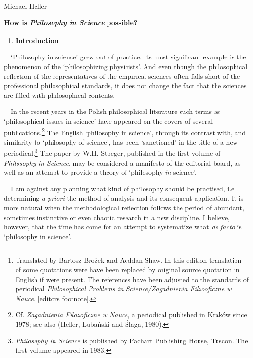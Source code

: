 \documentclass[a4paper]{article}
\title{}
\begin{document}
{\centering
Michael Heller
\par}

{\centering
\textbf{How is }\textbf{\textit{Philosophy in Science }}\textbf{possible?}
\par}

\begin{enumerate}
\item \textbf{Introduction}\footnote{Translated by Bartosz Brożek and Aeddan Shaw. In this edition translation of some
quotations were have been replaced by original source quotation in English if were present. The references have been
adjusted to the standards of periodical \textit{Philosophical Problems in Science/Zagadnienia Filzooficzne w Nauce}.
[editors footnote].}
\end{enumerate}
\ \ ‘Philosophy in science’ grew out of practice. Its most significant example is the phenomenon of the ‘philosophizing
physicists’. And even though the philosophical reflection of the representatives of the empirical sciences often falls
short of the professional philosophical standards, it does not change the fact that the sciences are filled with
philosophical contents.

\ \ In the recent years in the Polish philosophical literature such terms as ‘philosophical issues in science’ have
appeared on the covers of several publications.\footnote{Cf. \textit{Zagadnienia Filozoficzne w Nauce}, a periodical
published in Kraków since 1978; see also \label{ref:RNDeyUVXQ9KCX}(Heller, Lubański and Ślaga, 1980).} The English
‘philosophy in science’, through its contrast with, and similarity to ‘philosophy of science’, has been ‘sanctioned’ in
the title of a new periodical.\footnote{\textit{Philosophy in Science} is published by Pachart Publishing House,
Tuscon. The first volume appeared in 1983.} The paper by W.H. Stoeger, published in the first volume of
\textit{Philosophy in Science}, may be considered a manifesto of the editorial board, as well as an attempt to provide
a theory of ‘philosophy \textit{in} science’. 

\ \ I am against any planning what kind of philosophy should be practised, i.e. determining \textit{a priori} the method
of analysis and its consequent application. It is more natural when the methodological reflection follows the period of
abundant, sometimes instinctive or even chaotic research in a new discipline. I believe, however, that the time has
come for an attempt to systematize what \textit{de facto }is ‘philosophy in science’.
\end{document}
